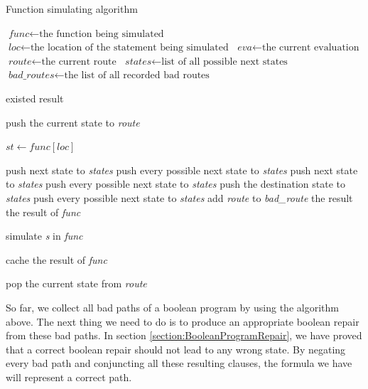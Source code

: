 \begin{algorithm}
\caption{Function simulating algorithm}
\begin{algorithmic}[1]

\STATE $\textit{func} \gets \text{the function being simulated}$
\STATE $\textit{loc} \gets \text{the location of the statement being simulated}$
\STATE $\textit{eva} \gets \text{the current evaluation}$
\STATE $\textit{route} \gets \text{the current route}$
\STATE $\textit{states} \gets \text{list of all possible next states}$
\STATE $\textit{bad\_routes} \gets \text{the list of all recorded bad routes}$
\STATE

    \RETURN existed result
  \ENDIF
\ENDIF

\STATE
\STATE push the current state to \textit{route}

\STATE
\STATE $\textit{st} \gets \textit{func}[\textit{loc}]$

    \STATE push next state to \textit{states}
  \ELSE
    \STATE push every possible next state to \textit{states}
  \ENDIF
{}
    \STATE push next state to \textit{states}
  \ELSE
    \STATE push every possible next state to \textit{states}
  \ENDIF
{}
  \STATE push the destination state to \textit{states}
  \STATE push every possible next state to \textit{states}
      \STATE add \textit{route} to \textit{bad\_route}
      \RETURN the result
    \ENDIF
  \ENDIF
\ELSE
    \RETURN the result of \textit{func}
  \ENDIF
\ENDIF

\STATE
{}
  \STATE simulate \textit{s} in \textit{func}
\ENDFOR

\STATE
{}
  \STATE cache the result of \textit{func}
\ENDIF

\STATE
\STATE pop the current state from \textit{route}
\end{algorithmic}
\end{algorithm}

So far, we collect all bad paths of a boolean program by using the algorithm above. The next thing we need to do is to produce an appropriate boolean repair from these bad paths.
In section \ref{section:BooleanProgramRepair}, we have proved that a correct boolean repair should not lead to any wrong state.
By negating every bad path and conjuncting all these resulting clauses, the formula we have will represent a correct path.

